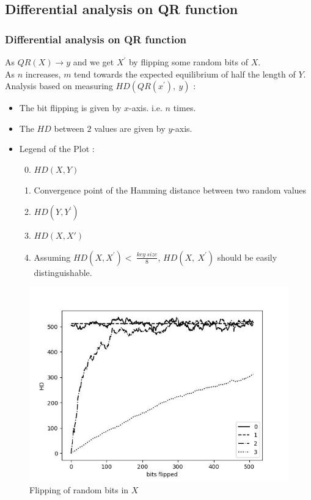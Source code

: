 \subsection{Differential analysis on QR function}
\begin{frame}
\frametitle{Differential analysis on QR function}
As $QR(X)\rightarrow y$ and we get $X^\prime$ by flipping some random bits of $X$. \\
As $n$ increases, $m$ tend towards the expected equilibrium of half the length of $Y$. Analysis based on measuring $HD ( QR (x^\prime), \ y)$ : 


\setlength{\columnsep}{10pt}
\begin{multicols}{2}
\setlength{\leftmargin}{1pt}

{\begin{itemize}
    \item \small{The bit flipping is given by $x$-axis. i.e. $n$ times.}
    \item \small{The $HD$ between $2$ values are given by $y$-axis.}
    \item \small{Legend of the Plot : }
    \begin{enumerate}
    \setcounter{enumi}{-1} %
        \item  \scriptsize{$HD(X,Y)$}
        \item  \scriptsize{Convergence point of the Hamming distance between two random values}
        \item \scriptsize{$HD(Y,Y^\prime)$}
        \item \scriptsize{$HD(X,X')$}
        \item[] \scriptsize{Assuming $HD(X,X^\prime) < \ \frac{key \ size}{8}$, $HD(X,\ X^\prime)$ should be easily distinguishable.}
    \end{enumerate}
\end{itemize}}

\columnbreak
\setlength{\rightmargin}{0pt}
\begin{figure}
    \centering
    \includegraphics[scale=0.52]{fig1.jpg}
    \caption{Flipping of random bits in $X$}
\end{figure}

\end{multicols}

\end{frame}